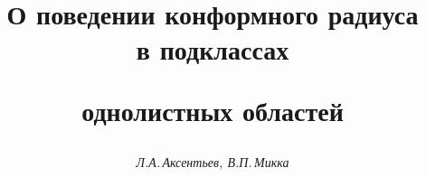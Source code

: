 




%





\newcommand{\re}{\operatorname{Re}}


\newcommand{\tts}[1]{}







\setcounter{page}{20}















\author{\it Л.А.\,Аксентьев, В.П.\,Микка}




\title{О поведении конформного радиуса\\ в подклассах


однолистных областей}





\date{}




\pagestyle{plain} %







\maketitle


\label{begin}





